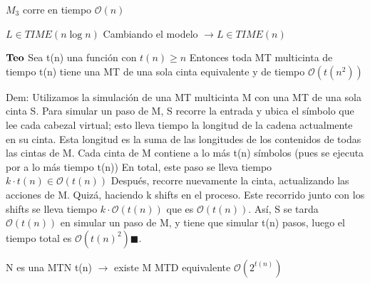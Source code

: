 \documentclass{homework}
\begin{document}
$M_3$ corre en tiempo $\mathcal{O}(n)$

$L \in TIME(n \log{n})$ 
Cambiando el modelo $\rightarrow L \in TIME(n)$

$\bf{Teo}$ Sea t(n) una función con $t(n) \geq n$
Entonces toda MT multicinta de tiempo t(n) tiene una MT de una sola cinta equivalente y de tiempo $\mathcal{O}(t(n^2))$

Dem: Utilizamos la simulación de una MT multicinta M con una MT de una sola cinta S.
Para simular un paso de M, S recorre la entrada y ubica el símbolo que lee cada cabezal virtual; esto lleva tiempo la longitud de la cadena actualmente en su cinta. Esta longitud es la suma de las longitudes de los contenidos de todas las cintas de M. Cada cinta de M contiene a lo más t(n) símbolos (pues se ejecuta por a lo más tiempo t(n)) En total, este paso se lleva tiempo $k \cdot t(n) \in \mathcal{O}(t(n))$
Después, recorre nuevamente la cinta, actualizando las acciones de M. Quizá, haciendo k shifts en el proceso. Este recorrido junto con los shifts se lleva tiempo $ k \cdot \mathcal{O}(t(n))$ que es $\mathcal{O}(t(n))$. Así, S se tarda $\mathcal{O}(t(n))$ en simular un paso de M, y tiene que simular t(n) pasos, luego el tiempo total es $\mathcal{O}(t(n)^2) \blacksquare$.

N es una MTN t(n) $\rightarrow$ existe M MTD equivalente $\mathcal{O}(2^{t(n)})$
\end{document}
